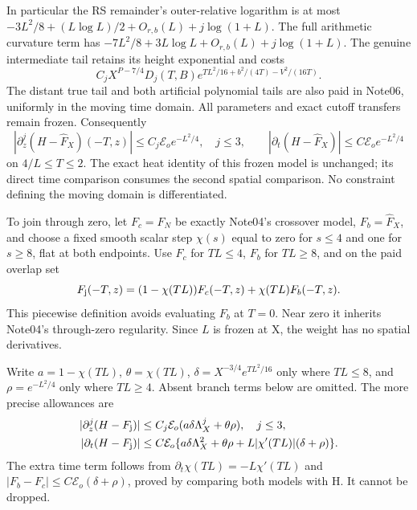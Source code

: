 \documentclass[11pt]{article}
\numberwithin{equation}{section}
\begin{document}
In particular the RS remainder's outer-relative logarithm is at most
\(-3L^2/8+(L\log L)/2+O_{r,b}(L)+j\log(1+L)\).
The full arithmetic curvature term has
\(-7L^2/8+3L\log L+O_{r,b}(L)+j\log(1+L)\).
The genuine intermediate tail retains its height exponential and costs
\[
 C_jX^{P-7/4}D_j(T,B)
 e^{TL^2/16+b^2/(4T)-V^2/(16T)}.
\]
The distant true tail and both artificial polynomial tails are also
paid in Note06, uniformly in the moving time domain. All parameters
and exact cutoff transfers remain frozen. Consequently
\begin{equation}
 |\partial_z^j(H-\widehat F_X)(-T,z)|
 \le C_j\mathcal E_o e^{-L^2/4},\quad j\le3,\qquad
 |\partial_t(H-\widehat F_X)|\le C\mathcal E_o e^{-L^2/4}
 \label{eq:bridge-theorem}
\end{equation}
on \(4/L\le T\le2\). The exact heat identity of this frozen model
is unchanged; its direct time comparison consumes the second spatial
comparison. No constraint defining the moving domain is differentiated.

To join through zero, let \(F_c=F_N\) be exactly Note04's crossover
model, \(F_b=\widehat F_X\), and choose a fixed smooth scalar step
\(\chi(s)\) equal to zero for \(s\le4\) and one for \(s\ge8\), flat
at both endpoints. Use \(F_c\) for \(TL\le4\), \(F_b\) for
\(TL\ge8\), and on the paid overlap set
\begin{equation}
 F_{\rm j}(-T,z)=(1-\chi(TL))F_c(-T,z)+\chi(TL)F_b(-T,z).
 \label{eq:negative-time-join}
\end{equation}
This piecewise definition avoids evaluating \(F_b\) at \(T=0\).
Near zero it inherits Note04's through-zero regularity. Since \(L\)
is frozen at X, the weight has no spatial derivatives.

Write \(a=1-\chi(TL)\), \(\theta=\chi(TL)\),
\(\delta=X^{-3/4}e^{TL^2/16}\) only where \(TL\le8\), and
\(\rho=e^{-L^2/4}\) only where \(TL\ge4\).
Absent branch terms below are omitted. The more precise allowances are
\begin{align}
 |\partial_z^j(H-F_{\rm j})|
  &\le C_j\mathcal E_o(a\delta\Lambda_X^j+\theta\rho),\quad j\le3,
       \label{eq:joined-weighted-jets}\\
 |\partial_t(H-F_{\rm j})|
  &\le C\mathcal E_o\{a\delta\Lambda_X^2+\theta\rho
          +L|\chi'(TL)|(\delta+\rho)\}.
       \label{eq:joined-weighted-time}
\end{align}
The extra time term follows from \(\partial_t\chi(TL)=-L\chi'(TL)\)
and \(|F_b-F_c|\le C\mathcal E_o(\delta+\rho)\), proved by comparing
both models with H. It cannot be dropped.
\end{document}
